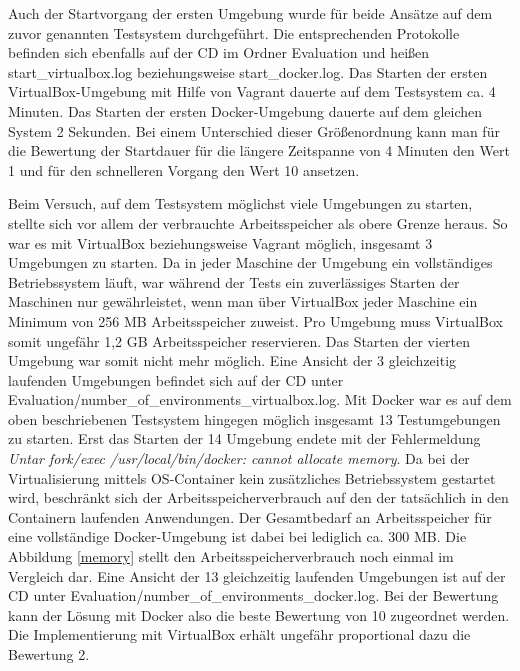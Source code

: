 Auch der Startvorgang der ersten Umgebung wurde für beide Ansätze auf dem zuvor genannten Testsystem durchgeführt. Die entsprechenden Protokolle befinden sich ebenfalls auf der CD im Ordner Evaluation und heißen start\_virtualbox.log beziehungsweise start\_docker.log. Das Starten der ersten VirtualBox-Umgebung mit Hilfe von Vagrant dauerte auf dem Testsystem ca. 4 Minuten. Das Starten der ersten Docker-Umgebung dauerte auf dem gleichen System 2 Sekunden. Bei einem Unterschied dieser Größenordnung kann man für die Bewertung der Startdauer für die längere Zeitspanne von 4 Minuten den Wert 1 und für den schnelleren Vorgang den Wert 10 ansetzen.

Beim Versuch, auf dem Testsystem möglichst viele Umgebungen zu starten, stellte sich vor allem der verbrauchte Arbeitsspeicher als obere Grenze heraus. So war es mit VirtualBox beziehungsweise Vagrant möglich, insgesamt 3 Umgebungen zu starten. Da in jeder Maschine der Umgebung ein vollständiges Betriebssystem läuft, war während der Tests ein zuverlässiges Starten der Maschinen nur gewährleistet, wenn man über VirtualBox jeder Maschine ein Minimum von 256 MB Arbeitsspeicher zuweist. Pro Umgebung muss VirtualBox somit ungefähr 1,2 GB Arbeitsspeicher reservieren. Das Starten der vierten Umgebung war somit nicht mehr möglich. Eine Ansicht der 3 gleichzeitig laufenden Umgebungen befindet sich auf der CD unter Evaluation/number\_of\_environments\_virtualbox.log. Mit Docker war es auf dem oben beschriebenen Testsystem hingegen möglich insgesamt 13 Testumgebungen zu starten. Erst das Starten der 14 Umgebung endete mit der Fehlermeldung \textit{Untar fork/exec /usr/local/bin/docker: cannot allocate memory}. Da bei der Virtualisierung mittels OS-Container kein zusätzliches Betriebssystem gestartet wird, beschränkt sich der Arbeitsspeicherverbrauch auf den der tatsächlich in den Containern laufenden Anwendungen. Der Gesamtbedarf an Arbeitsspeicher für eine vollständige Docker-Umgebung ist dabei bei lediglich ca. 300 MB. Die Abbildung \ref{memory} stellt den Arbeitsspeicherverbrauch noch einmal im Vergleich dar. Eine Ansicht der 13 gleichzeitig laufenden Umgebungen ist auf der CD unter Evaluation/number\_of\_environments\_docker.log. Bei der Bewertung kann der Lösung mit Docker also die beste Bewertung von 10 zugeordnet werden. Die Implementierung mit VirtualBox erhält ungefähr proportional dazu die Bewertung 2.

